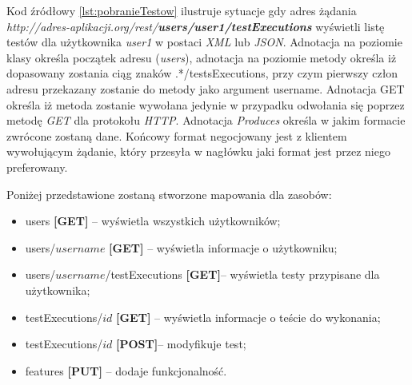  Kod źródłowy \ref{lst:pobranieTestow} ilustruje sytuacje gdy adres żądania \textit{http://adres-aplikacji.org/rest/\textbf{users/user1/testExecutions}} wyświetli listę testów dla użytkownika \textit{user1} w postaci \textit{XML} lub \textit{JSON}. Adnotacja na poziomie klasy określa początek adresu (\textit{users}), adnotacja na poziomie metody określa iż dopasowany zostania ciąg znaków .*/testsExecutions, przy czym pierwszy człon adresu przekazany zostanie do metody jako argument username. Adnotacja GET określa iż metoda zostanie wywołana jedynie w przypadku odwołania się poprzez metodę \textit{GET} dla protokołu \textit{HTTP}. Adnotacja \textit{Produces} określa w jakim formacie zwrócone zostaną dane. Końcowy format negocjowany jest z klientem wywołującym żądanie, który przesyła w nagłówku jaki format jest przez niego preferowany.
 
Poniżej przedstawione zostaną stworzone mapowania dla zasobów:
\begin{itemize}
  \item users \textbf{[GET]} -- wyświetla wszystkich użytkowników;
  \item users/{$username$} \textbf{[GET]} -- wyświetla informacje o użytkowniku;
  \item users/{$username$}/testExecutions \textbf{[GET]}-- wyświetla testy przypisane dla użytkownika;
  \item testExecutions/{$id$} \textbf{[GET]} -- wyświetla informacje o teście do wykonania;
  \item testExecutions/{$id$} \textbf{[POST]}-- modyfikuje test;
  \item features \textbf{[PUT]} -- dodaje funkcjonalność.
  
\end{itemize}


